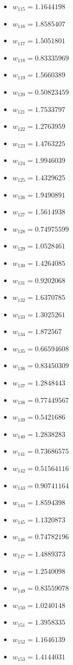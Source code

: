\documentclass[11pt]{article}
\begin{document}
\begin{itemize}
\item $w_{115} = 1.1644198$
\item $w_{116} = 1.8585407$
\item $w_{117} = 1.5051801$
\item $w_{118} = 0.83335969$
\item $w_{119} = 1.5660389$
\item $w_{120} = 0.50823459$
\item $w_{121} = 1.7533797$
\item $w_{122} = 1.2763959$
\item $w_{123} = 1.4763225$
\item $w_{124} = 1.9946039$
\item $w_{125} = 1.4329625$
\item $w_{126} = 1.9490891$
\item $w_{127} = 1.5614938$
\item $w_{128} = 0.74975599$
\item $w_{129} = 1.0528461$
\item $w_{130} = 1.4264085$
\item $w_{131} = 0.9202068$
\item $w_{132} = 1.6370785$
\item $w_{133} = 1.3025261$
\item $w_{134} = 1.872567$
\item $w_{135} = 0.66594608$
\item $w_{136} = 0.83450309$
\item $w_{137} = 1.2848443$
\item $w_{138} = 0.77449567$
\item $w_{139} = 0.5421686$
\item $w_{140} = 1.2838283$
\item $w_{141} = 0.73686575$
\item $w_{142} = 0.51564116$
\item $w_{143} = 0.90741164$
\item $w_{144} = 1.8594398$
\item $w_{145} = 1.1320873$
\item $w_{146} = 0.74782196$
\item $w_{147} = 1.4889373$
\item $w_{148} = 1.2540098$
\item $w_{149} = 0.83559078$
\item $w_{150} = 1.0240148$
\item $w_{151} = 1.3958335$
\item $w_{152} = 1.1646139$
\item $w_{153} = 1.4144031$

\end{itemize}
\end{document}
